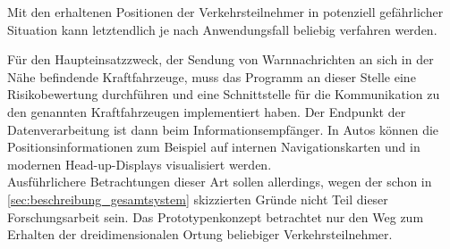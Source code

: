 Mit den erhaltenen Positionen der Verkehrsteilnehmer in potenziell gefährlicher Situation kann letztendlich je nach Anwendungsfall beliebig verfahren werden.\kleinerabstand

\noindent Für den Haupteinsatzzweck, der Sendung von Warnnachrichten an sich in der Nähe befindende Kraftfahrzeuge, muss das Programm an dieser Stelle eine Risikobewertung durchführen und eine Schnittstelle für die Kommunikation zu den genannten Kraftfahrzeugen implementiert haben. Der Endpunkt der Datenverarbeitung ist dann beim Informationsempfänger. In Autos können die Positionsinformationen zum Beispiel auf internen Navigationskarten und in modernen Head-up-Displays visualisiert werden.\\
Ausführlichere Betrachtungen dieser Art sollen allerdings, wegen der schon in \ref{sec:beschreibung_gesamtsystem} skizzierten Gründe nicht Teil dieser Forschungsarbeit sein. Das Prototypenkonzept betrachtet nur den Weg zum Erhalten der dreidimensionalen Ortung beliebiger Verkehrsteilnehmer.
